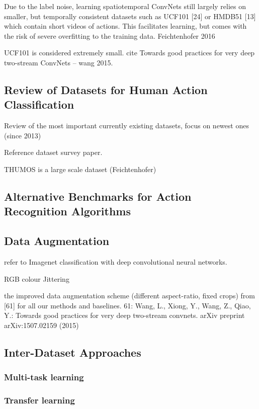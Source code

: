 Due to the label noise, learning spatiotemporal ConvNets still largely relies on smaller, but temporally consistent datasets such as UCF101 [24] or HMDB51 [13] which contain short videos of actions.
This facilitates learning, but comes with the risk of severe overfitting to the training data. Feichtenhofer 2016

UCF101 is considered extremely small. cite Towards good practices for very deep two-stream ConvNets -- wang 2015.

\subsection{Review of Datasets for Human Action Classification}
Review of the most important currently existing datasets, focus on newest ones (since 2013)

Reference dataset survey paper.

THUMOS is a large scale dataset (Feichtenhofer)

\subsection{Alternative Benchmarks for Action Recognition Algorithms}

\subsection{Data Augmentation}

refer to Imagenet classification with deep convolutional neural networks.

RGB colour Jittering

the improved data augmentation scheme (different aspect-ratio, fixed crops)
from [61] for all our methods and baselines.
61: Wang, L., Xiong, Y., Wang, Z., Qiao, Y.: Towards good practices for very
deep two-stream convnets. arXiv preprint arXiv:1507.02159 (2015)

\subsection{Inter-Dataset Approaches}

\subsubsection{Multi-task learning}

\subsubsection{Transfer learning}

